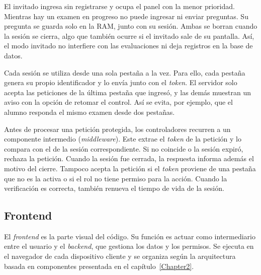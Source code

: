 El invitado ingresa sin registrarse y ocupa el panel con la menor prioridad. Mientras hay un examen en progreso no puede ingresar ni enviar preguntas. Su pregunta se guarda solo en la RAM, junto con su sesión. Ambas se borran cuando la sesión se cierra, algo que también ocurre si el invitado sale de su pantalla. Así, el modo invitado no interfiere con las evaluaciones ni deja registros en la base de datos.


Cada sesión se utiliza desde una sola pestaña a la vez. Para ello, cada pestaña genera su propio identificador y lo envía junto con el \emph{token}. El servidor solo acepta las peticiones de la última pestaña que ingresó, y las demás muestran un aviso con la opción de retomar el control. Así se evita, por ejemplo, que el alumno responda el mismo examen desde dos pestañas.



Antes de procesar una petición protegida, los controladores recurren a un componente intermedio (\emph{middleware}). Este extrae el \emph{token} de la petición y lo compara con el de la sesión correspondiente. Si no coincide o la sesión expiró, rechaza la petición. Cuando la sesión fue cerrada, la respuesta informa además el motivo del cierre. Tampoco acepta la petición si el \emph{token} proviene de una pestaña que no es la activa o si el rol no tiene permiso para la acción. Cuando la verificación es correcta, también renueva el tiempo de vida de la sesión.

\subsection{Frontend}

El \emph{frontend} es la parte visual del código. Su función es actuar como intermediario entre el usuario y el \emph{backend}, que gestiona los datos y los permisos. Se ejecuta en el navegador de cada dispositivo cliente y se organiza según la arquitectura basada en componentes presentada en el capítulo~\ref{Chapter2}.

